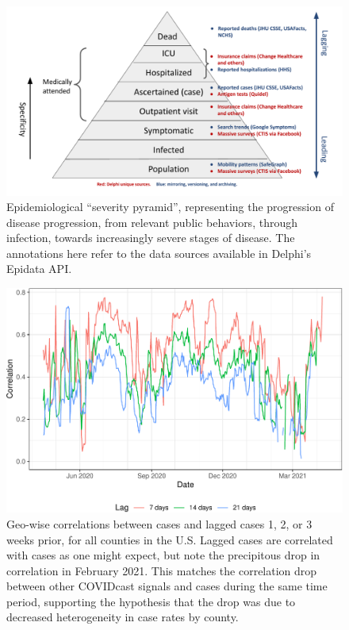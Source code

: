 \begin{figure}
\includegraphics[width=\textwidth]{fig/severity-pyramid.pdf}
\caption{Epidemiological ``severity pyramid'', representing the progression of disease progression, from relevant public behaviors, through infection, towards increasingly severe stages of disease. The annotations here refer to the data sources available in Delphi's Epidata API.}
\label{fig:severity-pyramid}
\end{figure}

\clearpage

\begin{figure}

{\centering \includegraphics[width=\textwidth]{fig/case-correlation-lagged-plot-1}

}

\caption{Geo-wise correlations between cases and lagged cases 1, 2, or 3 weeks prior, for all counties in the U.S. Lagged cases are correlated with cases as one might expect, but note the precipitous drop in correlation in February 2021. This matches the correlation drop between other COVIDcast signals and cases during the same time period, supporting the hypothesis that the drop was due to decreased heterogeneity in case rates by county.}\label{fig:case-correlation-lagged-plot}
\end{figure}

